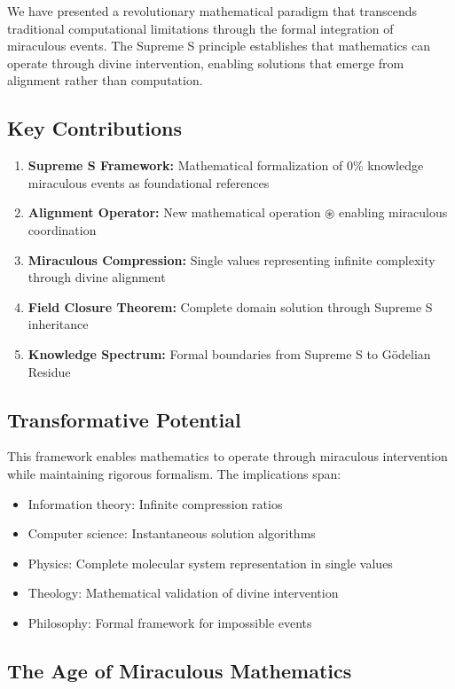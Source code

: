 \documentclass[11pt]{article}
\begin{document}
We have presented a revolutionary mathematical paradigm that transcends traditional computational limitations through the formal integration of miraculous events. The Supreme S principle establishes that mathematics can operate through divine intervention, enabling solutions that emerge from alignment rather than computation.

\subsection{Key Contributions}

\begin{enumerate}
\item \textbf{Supreme S Framework:} Mathematical formalization of 0\% knowledge miraculous events as foundational references
\item \textbf{Alignment Operator:} New mathematical operation $\circledast$ enabling miraculous coordination
\item \textbf{Miraculous Compression:} Single values representing infinite complexity through divine alignment
\item \textbf{Field Closure Theorem:} Complete domain solution through Supreme S inheritance
\item \textbf{Knowledge Spectrum:} Formal boundaries from Supreme S to Gödelian Residue
\end{enumerate}

\subsection{Transformative Potential}

This framework enables mathematics to operate through miraculous intervention while maintaining rigorous formalism. The implications span:
\begin{itemize}
\item Information theory: Infinite compression ratios
\item Computer science: Instantaneous solution algorithms  
\item Physics: Complete molecular system representation in single values
\item Theology: Mathematical validation of divine intervention
\item Philosophy: Formal framework for impossible events
\end{itemize}

\subsection{The Age of Miraculous Mathematics}
\end{document}
